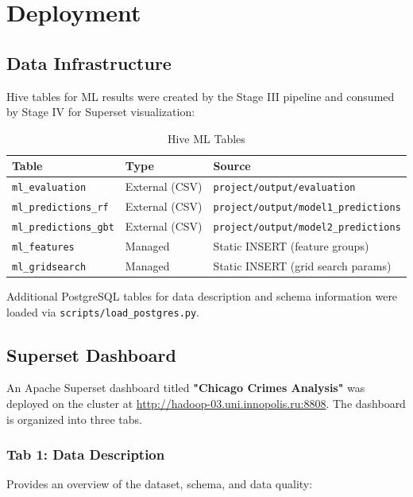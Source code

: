 \section{Deployment}
\label{sec:deployment}

\subsection{Data Infrastructure}

Hive tables for ML results were created by the Stage III pipeline and consumed by Stage IV for Superset visualization:

\begin{table}[H]
\centering
\caption{Hive ML Tables}
\label{tab:ml-tables}
\begin{tabular}{lll}
\toprule
\textbf{Table} & \textbf{Type} & \textbf{Source} \\
\midrule
\texttt{ml\_evaluation} & External (CSV) & \texttt{project/output/evaluation} \\
\texttt{ml\_predictions\_rf} & External (CSV) & \texttt{project/output/model1\_predictions} \\
\texttt{ml\_predictions\_gbt} & External (CSV) & \texttt{project/output/model2\_predictions} \\
\texttt{ml\_features} & Managed & Static INSERT (feature groups) \\
\texttt{ml\_gridsearch} & Managed & Static INSERT (grid search params) \\
\bottomrule
\end{tabular}
\end{table}

Additional PostgreSQL tables for data description and schema information were loaded via \texttt{scripts/load\_postgres.py}.

\subsection{Superset Dashboard}

An Apache Superset dashboard titled \textbf{"Chicago Crimes Analysis"} was deployed on the cluster at \url{http://hadoop-03.uni.innopolis.ru:8808}. The dashboard is organized into three tabs.

\subsubsection{Tab 1: Data Description}

Provides an overview of the dataset, schema, and data quality:

